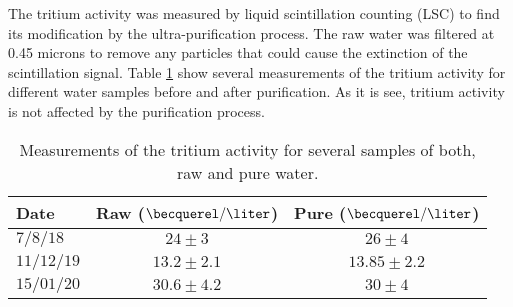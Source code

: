 
The tritium activity was measured by liquid scintillation counting (LSC) to find its modification by the ultra-purification process. The raw water was filtered at 0.45 microns to remove any particles that could cause the extinction of the scintillation signal. Table \ref{tab:ActivityTritiumValues} show several measurements of the tritium activity for different water samples before and after purification. As it is see, tritium activity is not affected by the purification process.

\begin{table}[htbp]
\centering{}%
\begin{tabular}{lcc}
\toprule 
Date & Raw ($\becquerel/\liter$) & Pure ($\becquerel/\liter$) \tabularnewline
\midrule
\midrule 
$7/8/18$ & $24 \pm 3$ & $26 \pm 4$ \tabularnewline
$11/12/19$ & $13.2 \pm 2.1$ & $13.85 \pm 2.2$ \tabularnewline
$15/01/20$ & $30.6 \pm 4.2$ & $30 \pm 4$ \tabularnewline
\bottomrule
\end{tabular}
\caption{Measurements of the tritium activity for several samples of both, raw and pure water.}
\label{tab:ActivityTritiumValues}
\end{table}